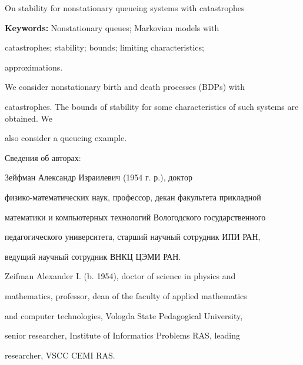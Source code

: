 On stability for nonstationary queueing systems with catastrophes





\medskip


{\bf Keywords:} Nonstationary queues; Markovian models with


catastrophes; stability; bounds; limiting characteristics;


approximations.





\medskip





We consider nonstationary birth and death processes (BDPs) with


catastrophes. The bounds of stability for some characteristics of such systems are obtained. We


also  consider a queueing example.











\newpage





Сведения об авторах:





Зейфман Александр Израилевич (1954 г. р.), доктор


физико-математических наук, профессор, декан факультета прикладной


математики и компьютерных технологий Вологодского государственного


педагогического университета, старший научный сотрудник ИПИ РАН,


ведущий научный сотрудник ВНКЦ ЦЭМИ РАН.





Zeifman Alexander I. (b. 1954), doctor of science in physics and


mathematics, professor, dean of the faculty of applied mathematics


and computer technologies, Vologda State Pedagogical University,


senior researcher, Institute of Informatics Problems RAS, leading


researcher, VSCC CEMI RAS.





